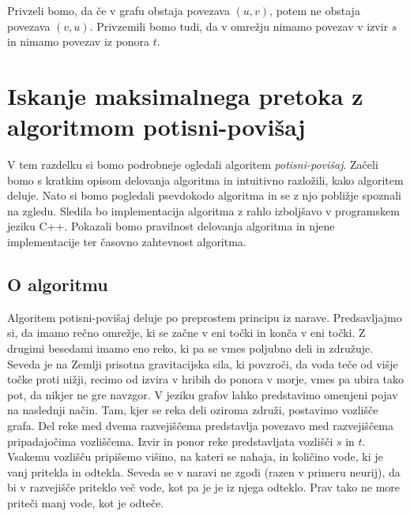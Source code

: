 \documentclass[mat1]{fmfdelo}
\begin{document}
\begin{opomba}
Privzeli bomo, da če v grafu obstaja povezava $(u,v)$, potem ne obstaja povezava $(v,u)$. Privzemili bomo tudi, da v omrežju nimamo povezav v izvir $s$ in nimamo povezav iz ponora $t$.
\end{opomba}







\section{Iskanje maksimalnega pretoka z algoritmom potisni-povišaj}

V tem razdelku si bomo podrobneje ogledali algoritem \textit{potisni-povišaj}. Začeli bomo s kratkim opisom delovanja algoritma in intuitivno razložili, kako algoritem deluje. Nato si bomo pogledali psevdokodo algoritma in se z njo pobližje spoznali na zgledu. Sledila bo implementacija algoritma z rahlo izboljšavo v programskem jeziku C++. Pokazali bomo pravilnost delovanja algoritma in njene implementacije ter časovno zahtevnost algoritma.

\subsection{O algoritmu}
Algoritem potisni-povišaj deluje po preprostem principu iz na\-ra\-ve. Predsavljajmo si, da imamo rečno omrežje, ki se začne v eni točki in konča v eni točki. Z drugimi besedami imamo eno reko, ki pa se vmes poljubno deli in združuje. Seveda je na Zemlji prisotna gravitacijska sila, ki povzroči, da voda teče od višje točke proti nižji, recimo od izvira v hribih do ponora v morje, vmes pa ubira tako pot, da nikjer ne gre navzgor. V jeziku grafov lahko predstavimo omenjeni pojav na naslednji način. Tam, kjer se reka deli oziroma združi, postavimo vozlišče grafa. Del reke med dvema razvejiščema predstavlja povezavo med razvejiščema pripadajočima vozliščema. Izvir in ponor reke predstavljata vozlišči $s$ in $t$. Vsakemu vozlišču pripišemo višino, na kateri se nahaja, in količino vode, ki je vanj pritekla in odtekla. Seveda se v naravi ne zgodi (razen v primeru neurij), da bi v razvejišče priteklo več vode, kot pa je je iz njega odteklo. Prav tako ne more priteči manj vode, kot je odteče.
\end{document}
